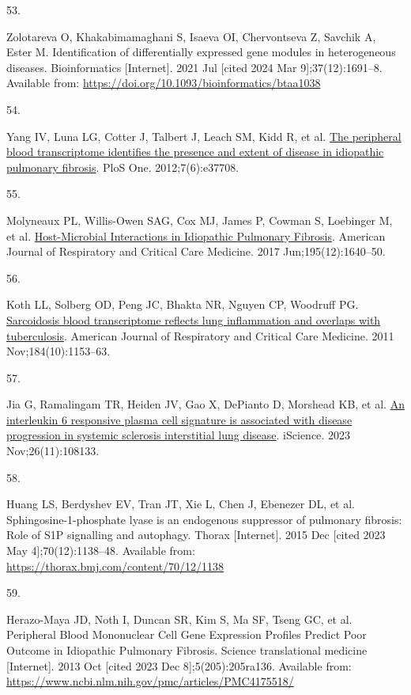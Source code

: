 \documentclass[
]{article}
\newlength{\cslhangindent}
\newlength{\csllabelwidth}
\newenvironment{CSLReferences}[2] %
 {\begin{list}{}{%
  \setlength{\itemindent}{0pt}
  \setlength{\leftmargin}{0pt}
  \setlength{\parsep}{0pt}
  \ifodd #1
   \setlength{\leftmargin}{\cslhangindent}
   \setlength{\itemindent}{-1\cslhangindent}
  \fi
  \setlength{\itemsep}{#2\baselineskip}}}
 {\end{list}}
\newcommand{\CSLLeftMargin}[1]{\parbox[t]{\csllabelwidth}{\strut#1\strut}}
\newcommand{\CSLRightInline}[1]{\parbox[t]{\linewidth - \csllabelwidth}{\strut#1\strut}}
\begin{document}
\begin{CSLReferences}{0}{1}
\CSLLeftMargin{53. }%
\CSLRightInline{Zolotareva O, Khakabimamaghani S, Isaeva OI, Chervontseva Z, Savchik A, Ester M. Identification of differentially expressed gene modules in heterogeneous diseases. Bioinformatics {[}Internet{]}. 2021 Jul {[}cited 2024 Mar 9{]};37(12):1691--8. Available from: \url{https://doi.org/10.1093/bioinformatics/btaa1038}}

\CSLLeftMargin{54. }%
\CSLRightInline{Yang IV, Luna LG, Cotter J, Talbert J, Leach SM, Kidd R, et al. \href{https://doi.org/10.1371/journal.pone.0037708}{The peripheral blood transcriptome identifies the presence and extent of disease in idiopathic pulmonary fibrosis}. PloS One. 2012;7(6):e37708. }

\CSLLeftMargin{55. }%
\CSLRightInline{Molyneaux PL, Willis-Owen SAG, Cox MJ, James P, Cowman S, Loebinger M, et al. \href{https://doi.org/10.1164/rccm.201607-1408OC}{Host-{Microbial} {Interactions} in {Idiopathic} {Pulmonary} {Fibrosis}}. American Journal of Respiratory and Critical Care Medicine. 2017 Jun;195(12):1640--50. }

\CSLLeftMargin{56. }%
\CSLRightInline{Koth LL, Solberg OD, Peng JC, Bhakta NR, Nguyen CP, Woodruff PG. \href{https://doi.org/10.1164/rccm.201106-1143OC}{Sarcoidosis blood transcriptome reflects lung inflammation and overlaps with tuberculosis}. American Journal of Respiratory and Critical Care Medicine. 2011 Nov;184(10):1153--63. }

\CSLLeftMargin{57. }%
\CSLRightInline{Jia G, Ramalingam TR, Heiden JV, Gao X, DePianto D, Morshead KB, et al. \href{https://doi.org/10.1016/j.isci.2023.108133}{An interleukin 6 responsive plasma cell signature is associated with disease progression in systemic sclerosis interstitial lung disease}. iScience. 2023 Nov;26(11):108133. }

\CSLLeftMargin{58. }%
\CSLRightInline{Huang LS, Berdyshev EV, Tran JT, Xie L, Chen J, Ebenezer DL, et al. Sphingosine-1-phosphate lyase is an endogenous suppressor of pulmonary fibrosis: Role of {S1P} signalling and autophagy. Thorax {[}Internet{]}. 2015 Dec {[}cited 2023 May 4{]};70(12):1138--48. Available from: \url{https://thorax.bmj.com/content/70/12/1138}}

\CSLLeftMargin{59. }%
\CSLRightInline{Herazo-Maya JD, Noth I, Duncan SR, Kim S, Ma SF, Tseng GC, et al. Peripheral {Blood} {Mononuclear} {Cell} {Gene} {Expression} {Profiles} {Predict} {Poor} {Outcome} in {Idiopathic} {Pulmonary} {Fibrosis}. Science translational medicine {[}Internet{]}. 2013 Oct {[}cited 2023 Dec 8{]};5(205):205ra136. Available from: \url{https://www.ncbi.nlm.nih.gov/pmc/articles/PMC4175518/}}


\end{CSLReferences}
\end{document}
